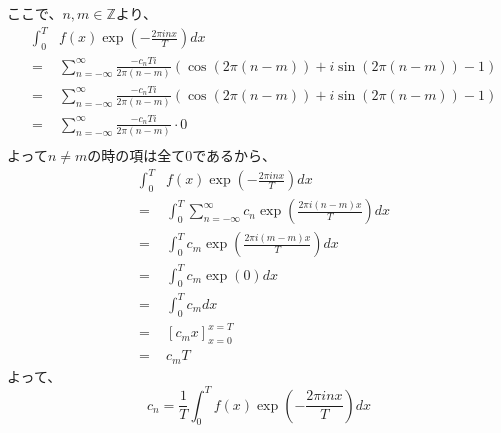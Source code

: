 \documentclass[a4paper]{jsarticle}
\begin{document}
ここで、$ n,m \in \mathbb{Z} $より、
\begin{eqnarray}
	& \int _0 ^T & f \left( x \right) \exp \left( - \frac { 2 \pi inx } { T } \right) dx \nonumber \\
	&=& \sum _{ n = - \infty } ^\infty \frac { -c_nTi } { 2 \pi \left( n - m \right) } \left( \cos \left( 2 \pi \left( n - m \right) \right) + i \sin \left( 2 \pi \left( n - m \right) \right) - 1 \right) \nonumber \\
	&=& \sum _{ n = - \infty } ^\infty \frac { -c_nTi } { 2 \pi \left( n - m \right) } \left( \cos \left( 2 \pi \left( n - m \right) \right) + i \sin \left( 2 \pi \left( n - m \right) \right) - 1 \right) \nonumber \\
	&=& \sum _{ n = - \infty } ^\infty \frac { -c_nTi } { 2 \pi \left( n - m \right) } \cdot 0 \nonumber \\
\end{eqnarray}
よって$ n \neq m $の時の項は全て$0$であるから、
\begin{eqnarray}
	& \int _0 ^T & f \left( x \right) \exp \left( - \frac { 2 \pi inx } { T } \right) dx \nonumber \\
	&=& \int _0 ^T \sum _{ n = - \infty } ^\infty c_n \exp \left( \frac { 2 \pi i \left( n - m \right) x } { T } \right) dx \nonumber \\
	&=& \int _0 ^T c_m \exp \left( \frac { 2 \pi i \left( m - m \right) x } { T } \right) dx \nonumber \\
	&=& \int _0 ^T c_m \exp \left( 0 \right) dx \nonumber \\
	&=& \int _0 ^T c_m dx \nonumber \\
	&=& \left[ c_m x \right] _{ x = 0 } ^{ x = T } \nonumber \\
	&=& c_m T
\end{eqnarray}
よって、
\begin{equation}
c_n = \frac { 1 } { T } \int _0 ^T f \left( x \right) \exp \left( - \frac { 2 \pi inx } { T } \right) dx
\end{equation}
\end{document}

